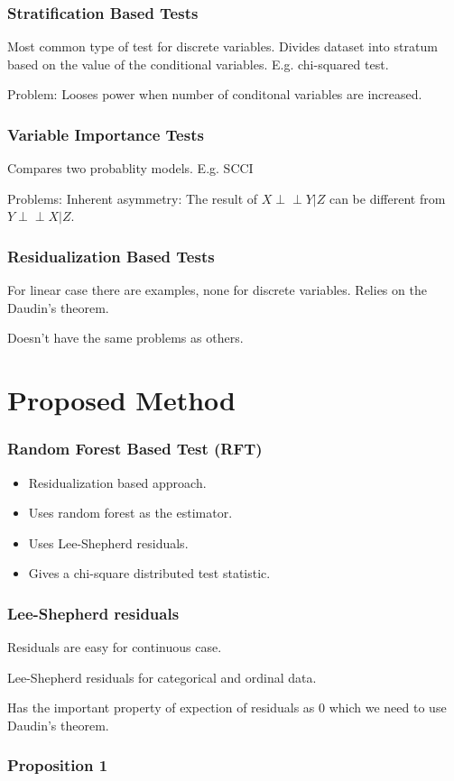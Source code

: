\documentclass{beamer}
\def\ci{\perp\!\!\!\!\!\perp}
\begin{document}
\begin{frame}
	\frametitle{Stratification Based Tests}
	Most common type of test for discrete variables.
	Divides dataset into stratum based on the value of the conditional
	variables. E.g. chi-squared test.

	Problem: Looses power when number of conditonal variables are increased.
\end{frame}

\begin{frame}
	\frametitle{Variable Importance Tests}
	Compares two probablity models. E.g. SCCI

	Problems: Inherent asymmetry: The result of $ X \ci Y | Z $ can be 
	different from $ Y \ci X | Z $.
\end{frame}

\begin{frame}
	\frametitle{Residualization Based Tests}
	For linear case there are examples, none for discrete variables.
	Relies on the Daudin's theorem.

	Doesn't have the same problems as others.
\end{frame}

\section{Proposed Method}
\begin{frame}
	\frametitle{Random Forest Based Test (RFT)}
	\begin{itemize}
		\item Residualization based approach.
		\item Uses random forest as the estimator.
		\item Uses Lee-Shepherd residuals.
		\item Gives a chi-square distributed test statistic.
	\end{itemize}
\end{frame}

\begin{frame}
	\frametitle{Lee-Shepherd residuals}
	Residuals are easy for continuous case.

	Lee-Shepherd residuals for categorical and ordinal data.

	Has the important property of expection of residuals as $ 0 $ which 
	we need to use Daudin's theorem.
\end{frame}

\begin{frame}
	\frametitle{Proposition 1}
	
\end{frame}
\end{document}
